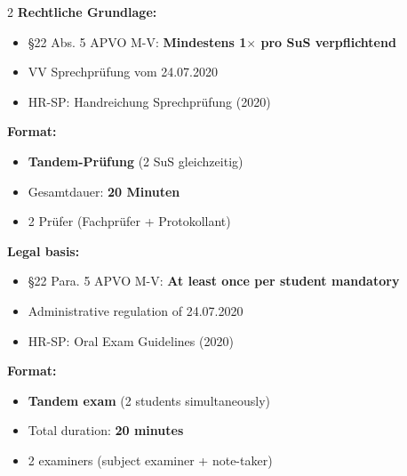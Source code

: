 \documentclass[10pt,a4paper]{article}
\begin{document}
\begin{paracol}{2}
\small
\textbf{Rechtliche Grundlage:}\footnotemark[11]
\begin{itemize}[noitemsep,topsep=2pt]
\item §22 Abs. 5 APVO M-V: \textbf{Mindestens 1$\times$ pro SuS verpflichtend}
\item VV Sprechprüfung vom 24.07.2020
\item HR-SP: Handreichung Sprechprüfung (2020)
\end{itemize}

\textbf{Format:}
\begin{itemize}[noitemsep,topsep=2pt]
\item \textbf{Tandem-Prüfung} (2 SuS gleichzeitig)
\item Gesamtdauer: \textbf{20 Minuten}
\item 2 Prüfer (Fachprüfer + Protokollant)
\end{itemize}

\switchcolumn

\small\color{english}
\textbf{Legal basis:}\footnotemark[11]
\begin{itemize}[noitemsep,topsep=2pt]
\item §22 Para. 5 APVO M-V: \textbf{At least once per student mandatory}
\item Administrative regulation of 24.07.2020
\item HR-SP: Oral Exam Guidelines (2020)
\end{itemize}

\textbf{Format:}
\begin{itemize}[noitemsep,topsep=2pt]
\item \textbf{Tandem exam} (2 students simultaneously)
\item Total duration: \textbf{20 minutes}
\item 2 examiners (subject examiner + note-taker)
\end{itemize}

\end{paracol}

\vspace{2mm}
\end{document}

